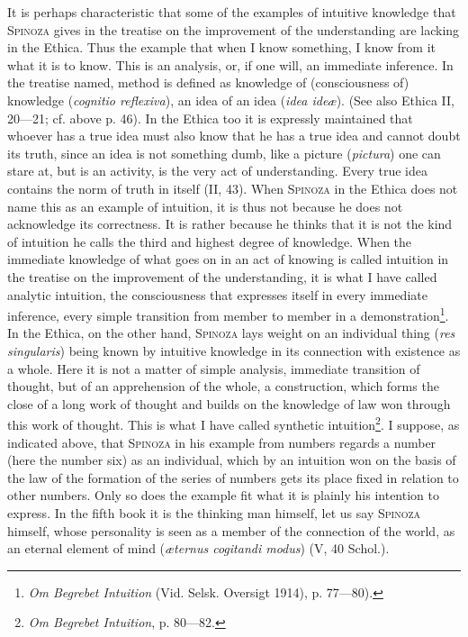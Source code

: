 \documentclass[12pt]{article}
\begin{document}
It is perhaps characteristic that some of the examples of intuitive knowledge that
\textsc{Spinoza} gives in the treatise on the improvement of the understanding are lacking in
the Ethica. Thus the example that when I know something, I know from it what it is to know.
This is an analysis, or, if one will, an immediate inference. In the treatise named, method is
defined as knowledge of (consciousness of) knowledge (\textit{cognitio reflexiva}), an idea of
an idea (\textit{idea ideæ}). (See also Ethica II, 20---21; cf. above p. 46). In the Ethica
too it is expressly maintained that whoever has a true idea must also know that he has a true
idea and cannot doubt its truth, since an idea is not something dumb, like a picture
(\textit{pictura}) one can stare at, but is an activity, is the very act of understanding.
Every true idea contains the norm of truth in itself (II, 43). When \textsc{Spinoza} in the
Ethica does not name this as an example of intuition, it is thus not because he does not
acknowledge its correctness. It is rather because he thinks that it is not the kind of
intuition he calls the third and highest degree of knowledge. When the immediate knowledge of
what goes on in an act of knowing is called intuition in the treatise on the improvement of
the understanding, it is what I have called analytic intuition, the consciousness that
expresses itself in every immediate inference, every simple transition from member to member
in a demonstration\footnote{\textit{Om Begrebet Intuition} (Vid. Selsk. Oversigt 1914),
p. 77---80).}. In the Ethica, on the other hand, \textsc{Spinoza} lays weight on an individual
thing (\textit{res singularis}) being known by intuitive knowledge in its connection with
existence as a whole. Here it is not a matter of simple analysis, immediate transition of
thought, but of an apprehension of the whole, a construction, which forms the close of a long
work of thought and builds on the knowledge of law won through this work of thought. This is
what I have called synthetic intuition\footnote{\textit{Om Begrebet Intuition}, p.
80---82.}. I suppose, as indicated above, that \textsc{Spinoza} in his example from numbers
regards a number (here the number six) as an individual, which by an intuition won on the
basis of the law of the formation of the series of numbers gets its place fixed in relation to
other numbers. Only so does the example fit what it is plainly his intention to express. In
the fifth book it is the thinking man himself, let us say \textsc{Spinoza} himself, whose
personality is seen as a member of the connection of the world, as an eternal element of mind
(\textit{æternus cogitandi modus}) (V, 40 Schol.).
\end{document}
